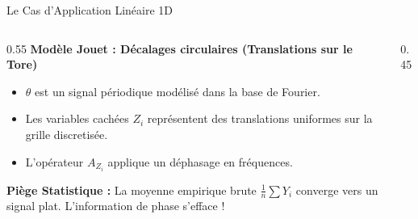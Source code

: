 \begin{frame}{Le Cas d'Application Linéaire 1D}
    \begin{columns}[c]
        \begin{column}{0.55\textwidth}
            \textbf{Modèle Jouet : Décalages circulaires (Translations sur le Tore)}
            \begin{itemize}
                \item $\theta$ est un signal périodique modélisé dans la base de Fourier.
                \item Les variables cachées $Z_i$ représentent des translations uniformes sur la grille discretisée.
                \item L'opérateur $A_{Z_i}$ applique un déphasage en fréquences.
            \end{itemize}
            \vspace{0.2cm}
            \alert{\textbf{Piège Statistique :}} La moyenne empirique brute $\frac{1}{n}\sum Y_i$ converge vers un signal plat. L'information de phase s'efface !
        \end{column}
        \begin{column}{0.45\textwidth}
            \centering
        \end{column}
    \end{columns}
\end{frame}